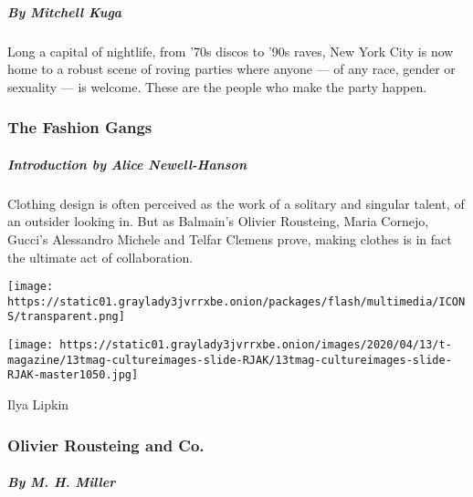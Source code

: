 \hypertarget{by-mitchell-kuga}{%
\subparagraph{By Mitchell Kuga}\label{by-mitchell-kuga}}

Long a capital of nightlife, from '70s discos to '90s raves, New York
City is now home to a robust scene of roving parties where anyone --- of
any race, gender or sexuality --- is welcome. These are the people who
make the party happen.

\href{https://www.nytimes3xbfgragh.onion/interactive/2020/04/13/t-magazine/maria-cornejo-olivier-rousteing-telfar-clemens-alessandro-michele.html}{}

\hypertarget{the-fashion-gangs}{%
\subsubsection{The Fashion Gangs}\label{the-fashion-gangs}}

\hypertarget{introduction-by-alice-newell-hanson}{%
\subparagraph{Introduction by Alice
Newell-Hanson}\label{introduction-by-alice-newell-hanson}}

Clothing design is often perceived as the work of a solitary and
singular talent, of an outsider looking in. But as Balmain's Olivier
Rousteing, Maria Cornejo, Gucci's Alessandro Michele and Telfar Clemens
prove, making clothes is in fact the ultimate act of collaboration.

\href{https://www.nytimes3xbfgragh.onion/interactive/2020/04/13/t-magazine/maria-cornejo-olivier-rousteing-telfar-clemens-alessandro-michele.html\#olivier-rousteing-and-co}{}

\texttt{[image: https://static01.graylady3jvrrxbe.onion/packages/flash/multimedia/ICONS/transparent.png]}

\texttt{[image: https://static01.graylady3jvrrxbe.onion/images/2020/04/13/t-magazine/13tmag-cultureimages-slide-RJAK/13tmag-cultureimages-slide-RJAK-master1050.jpg]}

Ilya Lipkin

\hypertarget{olivier-rousteing-and-co}{%
\subsubsection{Olivier Rousteing and
Co.}\label{olivier-rousteing-and-co}}

\hypertarget{by-m-h-miller-1}{%
\subparagraph{By M. H. Miller}\label{by-m-h-miller-1}}

\href{https://www.nytimes3xbfgragh.onion/interactive/2020/04/13/t-magazine/maria-cornejo-olivier-rousteing-telfar-clemens-alessandro-michele.html\#maria-cornejo-and-co}{}


